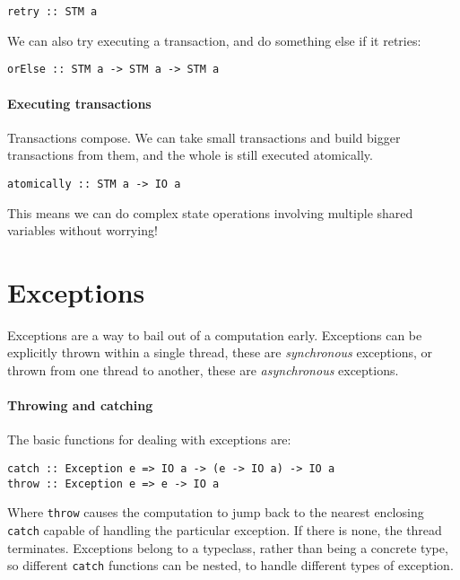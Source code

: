 \begin{verbatim}
retry :: STM a
\end{verbatim}

We can also try executing a transaction, and do something else if it
retries:

\begin{verbatim}
orElse :: STM a -> STM a -> STM a
\end{verbatim}

\paragraph{Executing transactions}
Transactions compose.  We can take small transactions and build bigger
transactions from them, and the whole is still executed atomically.

\begin{verbatim}
atomically :: STM a -> IO a
\end{verbatim}

This means we can do complex state operations involving multiple shared
variables without worrying!

\section{Exceptions}
\label{sec:concurrent_haskell-exc}

Exceptions are a way to bail out of a computation early.  Exceptions can be
explicitly thrown within a single thread, these are \emph{synchronous}
exceptions, or thrown from one thread to another, these are \emph{asynchronous}
exceptions.

\paragraph{Throwing and catching}
The basic functions for dealing with exceptions are:

\begin{verbatim}
catch :: Exception e => IO a -> (e -> IO a) -> IO a
throw :: Exception e => e -> IO a
\end{verbatim}

Where \verb|throw| causes the computation to jump back to the nearest
enclosing \verb|catch| capable of handling the particular exception.
If there is none, the thread terminates.  Exceptions belong to a
typeclass, rather than being a concrete type, so different
\verb|catch| functions can be nested, to handle different types of
exception.

